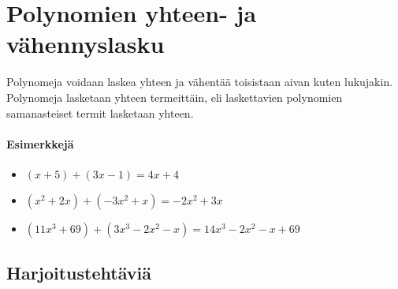 \chapter{Polynomien yhteen- ja vähennyslasku}

Polynomeja voidaan laskea yhteen ja vähentää toisistaan aivan kuten lukujakin. Polynomeja lasketaan yhteen termeittäin, eli laskettavien polynomien samanasteiset termit lasketaan yhteen.

\subsubsection*{Esimerkkejä}
\begin{itemize}
    \item $(x+5) + (3x-1) = 4x + 4$
    \item $(x^2 + 2x) + (-3x^2 + x) = -2x^2 + 3x$
    \item $(11x^3 + 69) + (3x^3 - 2x^2 - x) = 14x^3 - 2x^2 - x +69$
\end{itemize}

\section{Harjoitustehtäviä}
